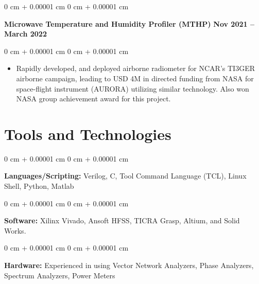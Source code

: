 \documentclass[10pt, letterpaper]{article}
\newenvironment{highlights}{
    \begin{itemize}[
        topsep=0.10 cm,
        parsep=0.10 cm,
        partopsep=0pt,
        itemsep=0pt,
        leftmargin=0 cm + 10pt     
    ]
}{
    \end{itemize}
} %
\newenvironment{onecolentry}{
    \begin{adjustwidth}{
        0 cm + 0.00001 cm
    }{
        0 cm + 0.00001 cm
    }
}{
    \end{adjustwidth}
} %
\newenvironment{twocolentry}[2][]{
    \onecolentry
    \def\secondColumn{#2}
    \setcolumnwidth{\fill, 4.5 cm}
    \begin{paracol}{2}
}{
    \switchcolumn \raggedleft \secondColumn
    \end{paracol}
    \endonecolentry
} %
\begin{document}
        \begin{twocolentry}{
            \textbf{Nov 2021 -- March 2022}
        }
            \textbf{Microwave Temperature and Humidity Profiler (MTHP)}\end{twocolentry}

        \vspace{0.20 cm}
        \begin{onecolentry}
            \begin{highlights}
                \item Rapidly developed, and deployed airborne radiometer for NCAR's TI3GER airborne campaign, leading to USD 4M in directed funding from NASA for space-flight instrument (AURORA) utilizing similar technology. Also won NASA group achievement award for this project.
            \end{highlights}
        \end{onecolentry}
        \vspace{0.3 cm}

    \section{Tools and Technologies}        
        \begin{onecolentry}
            \textbf{Languages/Scripting:} Verilog, C, Tool Command Language (TCL), Linux Shell, Python, Matlab
        \end{onecolentry}
        \vspace{0.2 cm}
        \begin{onecolentry}
            \textbf{Software:} Xilinx Vivado, Ansoft HFSS, TICRA Grasp, Altium, and Solid Works. 
        \end{onecolentry}
        \vspace{0.2 cm}
        \begin{onecolentry}
            \textbf{Hardware:}  Experienced in using Vector Network Analyzers, Phase Analyzers, Spectrum Analyzers, Power Meters
        \end{onecolentry} 

    
       


        
\end{document}
